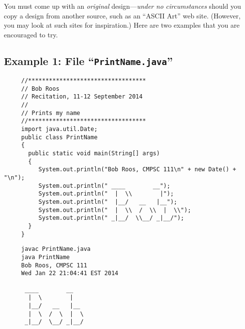 You must come up with an {\em original} design---{\em under no circumstances} should you copy a design from another
source, such as an ``ASCII Art'' web site. (However, you may look at such sites for inspiration.) Here are two examples
that you are encouraged to try.

\newpage

\subsection*{Example 1: File ``{\tt PrintName.java}''}
\begin{verbatim}
     //**********************************
     // Bob Roos
     // Recitation, 11-12 September 2014
     //
     // Prints my name
     //**********************************
     import java.util.Date;
     public class PrintName
     {
       public static void main(String[] args)
       {
          System.out.println("Bob Roos, CMPSC 111\n" + new Date() + "\n");
          System.out.println(" ____        __");
          System.out.println("  |  \\        |");
          System.out.println("  |__/   __   |__");
          System.out.println("  |  \\  /  \\  |  \\");
          System.out.println(" _|__/  \\__/ _|__/");
       }
     }
\end{verbatim}

\begin{verbatim}
     javac PrintName.java
     java PrintName
     Bob Roos, CMPSC 111
     Wed Jan 22 21:04:41 EST 2014
     
      ____        __
       |  \        |
       |__/   __   |__
       |  \  /  \  |  \
      _|__/  \__/ _|__/
\end{verbatim}

\newpage

